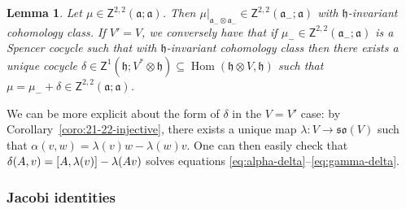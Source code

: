 \documentclass[11pt]{article}
\numberwithin{equation}{section}
\numberwithin{equation}{section}
\newtheorem{Lemma}[Theorem]{Lemma}
\newcommand{\fa}{\mathfrak{a}}
\newcommand{\fh}{\mathfrak{h}}
\newcommand{\fso}{\mathfrak{so}}
\newcommand{\ssZ}{\mathsf{Z}}
\newcommand{\1}{\mathbbm{1}}
\DeclareMathOperator{\Hom}{Hom}
\begin{document}
\begin{Lemma}\label{lemma:invt-spencer-cocycle}
	Let $\mu\in\ssZ^{2,2}(\fa;\fa)$. Then $\mu|_{\fa_-\otimes\fa_-}\in\ssZ^{2,2}(\fa_-;\fa)$ with $\fh$-invariant cohomology class. If $V'=V$, we conversely have that if $\mu_-\in\ssZ^{2,2}(\fa_-;\fa)$ is a Spencer cocycle such that with $\fh$-invariant cohomology class then there exists a unique cocycle $\delta\in\ssZ^1(\fh;V^*\otimes\fh)\subseteq\Hom(\fh\otimes V,\fh)$ such that $\mu=\mu_-+\delta\in\ssZ^{2,2}(\fa;\fa)$.
\end{Lemma}

We can be more explicit about the form of $\delta$ in the $V=V'$ case: by Corollary~\ref{coro:21-22-injective}, there exists a unique map $\lambda\colon V\to\fso(V)$ such that
$\alpha(v,w) = \lambda(v)w - \lambda(w)v$.
One can then easily check that
$\delta(A,v) = \comm{A}{\lambda(v)} - \lambda(Av)
$
solves equations \eqref{eq:alpha-delta}--\eqref{eq:gamma-delta}.

\subsubsection{Jacobi identities}
\end{document}
